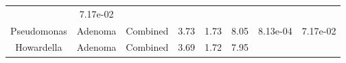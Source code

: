 \documentclass[12pt,]{article}
\begin{document}
\begin{longtable}[]{@{}cccccccc@{}}
\begin{minipage}[t]{0.06\columnwidth}
\end{minipage} & \begin{minipage}[t]{0.06\columnwidth}\centering\strut
7.17e-02\strut
\end{minipage}\tabularnewline
\begin{minipage}[t]{0.18\columnwidth}\centering\strut
Pseudomonas\strut
\end{minipage} & \begin{minipage}[t]{0.07\columnwidth}\centering\strut
Adenoma\strut
\end{minipage} & \begin{minipage}[t]{0.09\columnwidth}\centering\strut
Combined\strut
\end{minipage} & \begin{minipage}[t]{0.03\columnwidth}\centering\strut
3.73\strut
\end{minipage} & \begin{minipage}[t]{0.14\columnwidth}\centering\strut
1.73\strut
\end{minipage} & \begin{minipage}[t]{0.14\columnwidth}\centering\strut
8.05\strut
\end{minipage} & \begin{minipage}[t]{0.06\columnwidth}\centering\strut
8.13e-04\strut
\end{minipage} & \begin{minipage}[t]{0.06\columnwidth}\centering\strut
7.17e-02\strut
\end{minipage}\tabularnewline
\begin{minipage}[t]{0.18\columnwidth}\centering\strut
Howardella\strut
\end{minipage} & \begin{minipage}[t]{0.07\columnwidth}\centering\strut
Adenoma\strut
\end{minipage} & \begin{minipage}[t]{0.09\columnwidth}\centering\strut
Combined\strut
\end{minipage} & \begin{minipage}[t]{0.03\columnwidth}\centering\strut
3.69\strut
\end{minipage} & \begin{minipage}[t]{0.14\columnwidth}\centering\strut
1.72\strut
\end{minipage} & \begin{minipage}[t]{0.14\columnwidth}\centering\strut
7.95\strut
\end{minipage} & \begin{minipage}[t]{0.06\columnwidth}\centering\strut

\end{minipage}
\end{longtable}
\end{document}
